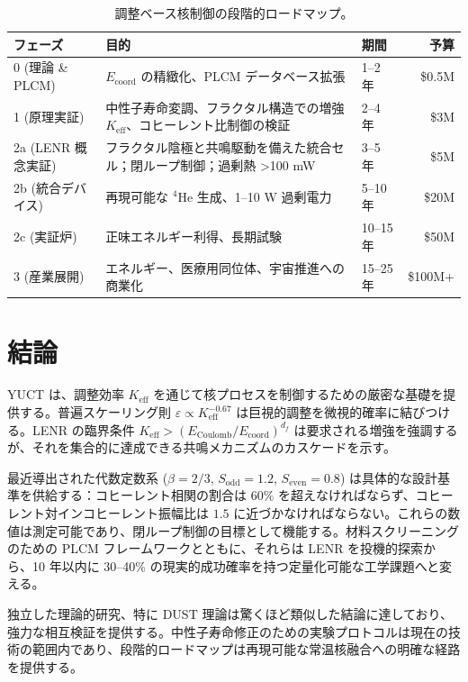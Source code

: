 \documentclass[12pt]{article}
\newcommand{\Keff}{K_{\mathrm{eff}}}
\newcommand{\df}{d_{\!f}}
\newcommand{\Sodd}{S_{\mathrm{odd}}}
\newcommand{\Seven}{S_{\mathrm{even}}}
\theoremstyle{remark}
\begin{document}
	\begin{table}[htbp]
		\centering
		\caption{調整ベース核制御の段階的ロードマップ。}
		\label{tab:roadmap}
		\small
		\begin{tabular}{l p{5cm} l r}
			\toprule
			\textbf{フェーズ} & \textbf{目的} & \textbf{期間} & \textbf{予算} \\
			\midrule
			0 (理論 \& PLCM) & \(E_{\mathrm{coord}}\) の精緻化、PLCM データベース拡張 & 1–2 年 & \$0.5M \\
			1 (原理実証) & 中性子寿命変調、フラクタル構造での増強 \(\Keff\)、コヒーレント比制御の検証 & 2–4 年 & \$3M \\
			2a (LENR 概念実証) & フラクタル陰極と共鳴駆動を備えた統合セル；閉ループ制御；過剰熱 >100 mW & 3–5 年 & \$5M \\
			2b (統合デバイス) & 再現可能な \(^4\)He 生成、1--10 W 過剰電力 & 5–10 年 & \$20M \\
			2c (実証炉) & 正味エネルギー利得、長期試験 & 10–15 年 & \$50M \\
			3 (産業展開) & エネルギー、医療用同位体、宇宙推進への商業化 & 15–25 年 & \$100M+ \\
			\bottomrule
		\end{tabular}
	\end{table}
	
	\section{結論}
	\label{sec:conclusion}
	
	YUCT は、調整効率 \(\Keff\) を通じて核プロセスを制御するための厳密な基礎を提供する。普遍スケーリング則 \(\varepsilon \propto \Keff^{-0.67}\) は巨視的調整を微視的確率に結びつける。LENR の臨界条件 \(\Keff > (E_{\text{Coulomb}}/E_{\text{coord}})^{\df}\) は要求される増強を強調するが、それを集合的に達成できる共鳴メカニズムのカスケードを示す。
	
	最近導出された代数定数系 (\(\beta=2/3\), \(\Sodd=1.2\), \(\Seven=0.8\)) は具体的な設計基準を供給する：コヒーレント相関の割合は \(60\%\) を超えなければならず、コヒーレント対インコヒーレント振幅比は \(1.5\) に近づかなければならない。これらの数値は測定可能であり、閉ループ制御の目標として機能する。材料スクリーニングのための PLCM フレームワークとともに、それらは LENR を投機的探索から、10 年以内に 30–40\% の現実的成功確率を持つ定量化可能な工学課題へと変える。
	
	独立した理論的研究、特に DUST 理論は驚くほど類似した結論に達しており、強力な相互検証を提供する。中性子寿命修正のための実験プロトコルは現在の技術の範囲内であり、段階的ロードマップは再現可能な常温核融合への明確な経路を提供する。
	
\end{document}
